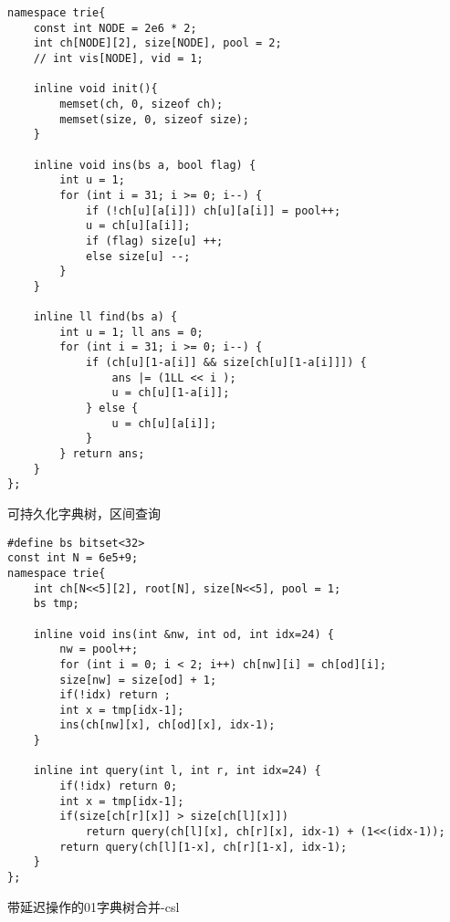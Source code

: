 \begin{lstlisting}
namespace trie{
    const int NODE = 2e6 * 2;
    int ch[NODE][2], size[NODE], pool = 2;
    // int vis[NODE], vid = 1;

    inline void init(){
        memset(ch, 0, sizeof ch);
        memset(size, 0, sizeof size);
    }

    inline void ins(bs a, bool flag) {
        int u = 1;
        for (int i = 31; i >= 0; i--) {
            if (!ch[u][a[i]]) ch[u][a[i]] = pool++;
            u = ch[u][a[i]];
            if (flag) size[u] ++;
            else size[u] --;
        }
    }

    inline ll find(bs a) {
        int u = 1; ll ans = 0;
        for (int i = 31; i >= 0; i--) {
            if (ch[u][1-a[i]] && size[ch[u][1-a[i]]]) {
                ans |= (1LL << i );
                u = ch[u][1-a[i]];
            } else {
                u = ch[u][a[i]];
            }
        } return ans;
    }
};
\end{lstlisting}

可持久化字典树，区间查询


\begin{lstlisting}
#define bs bitset<32>
const int N = 6e5+9;
namespace trie{
    int ch[N<<5][2], root[N], size[N<<5], pool = 1;
    bs tmp;

    inline void ins(int &nw, int od, int idx=24) {
        nw = pool++;
        for (int i = 0; i < 2; i++) ch[nw][i] = ch[od][i];
        size[nw] = size[od] + 1;
        if(!idx) return ;
        int x = tmp[idx-1];
        ins(ch[nw][x], ch[od][x], idx-1);
    }

    inline int query(int l, int r, int idx=24) {
        if(!idx) return 0;
        int x = tmp[idx-1];
        if(size[ch[r][x]] > size[ch[l][x]])
            return query(ch[l][x], ch[r][x], idx-1) + (1<<(idx-1));
        return query(ch[l][1-x], ch[r][1-x], idx-1);
    }
};
\end{lstlisting}


带延迟操作的01字典树合并-csl

